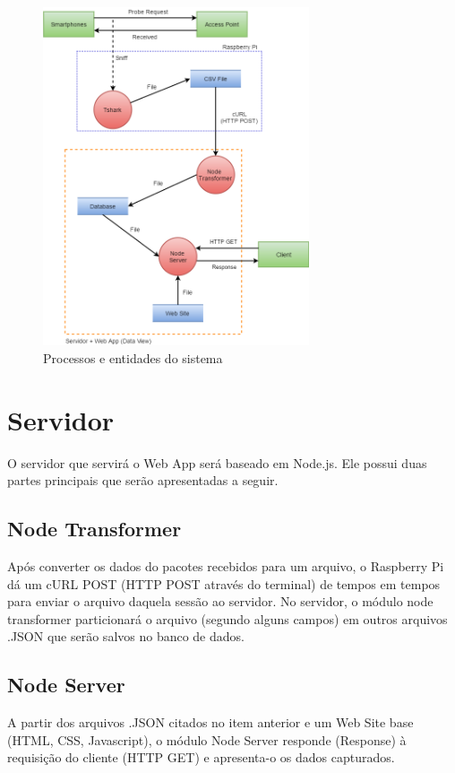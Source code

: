 \begin{figure}[!h]
  \caption{\label{diagrama-fluxo}Processos e entidades do sistema}
  \begin{center}
    \includegraphics[width=0.70\textwidth]{img/diagrama_fluxo.png}
  \end{center}
\end{figure}

\section{Servidor}
O servidor que servirá o Web App será baseado em Node.js. Ele possui duas partes principais que serão apresentadas a seguir.

\subsection{Node Transformer}
\label{node-transformer}
Após converter os dados do pacotes recebidos para um arquivo, o
Raspberry Pi dá um cURL POST (HTTP POST através do terminal) de tempos em tempos
para enviar o arquivo daquela sessão ao servidor. No servidor, o módulo
node transformer particionará o arquivo (segundo alguns campos) em outros
arquivos .JSON que serão salvos no banco de dados.

\subsection{Node Server}
 A partir dos arquivos .JSON citados no item anterior e um Web Site base (HTML,
 CSS, Javascript), o módulo Node Server responde (Response) à requisição do
 cliente (HTTP GET) e apresenta-o os dados capturados.


